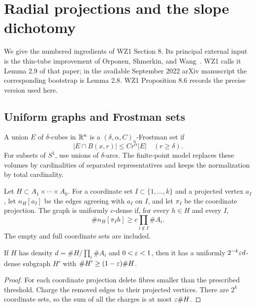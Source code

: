 \chapter{Radial projections and the slope dichotomy}
\label{chap:radial}

We give the numbered ingredients of WZ1 Section 8. Its principal
external input is the thin-tube improvement of Orponen, Shmerkin,
and Wang~\cite{OSW}. WZ1 calls it Lemma 2.9 of that paper; in the
available September 2022 arXiv manuscript the corresponding bootstrap
is Lemma 2.8. WZ1 Proposition 8.6 records the precise version used
here.

\section{Uniform graphs and Frostman sets}

\begin{definition}
\label{def:wz1-frostman}
A union $E$ of $\delta$-cubes in $\mathbb{R}^n$ is a
$(\delta,\alpha,C)_n$-Frostman set if
\[
                 |E\cap B(x,r)|\leq Cr^\alpha|E|
                 \quad(r\geq\delta).
\]
For subsets of $S^1$, use unions of $\delta$-arcs. The finite-point
model replaces these volumes by cardinalities of separated
representatives and keeps the normalization by total cardinality.
\end{definition}

\begin{definition}
\label{def:uniform-hypergraph}
\leanok
Let $H\subset A_1\times\cdots\times A_k$. For a coordinate set
$I\subset\{1,\ldots,k\}$ and a projected vertex $a_I$, let
$n_H[a_I]$ be the edges agreeing with $a_I$ on $I$, and let
$\pi_I$ be the coordinate projection. The graph is uniformly
$c$-dense if, for every $h\in H$ and every $I$,
\[
                    \#n_H[\pi_Ih]\geq c\prod_{i\notin I}\#A_i.
\]
The empty and full coordinate sets are included.
\end{definition}

\begin{lemma}
\label{lem:hypergraph-refinement}
\leanok
{}
If $H$ has density $d=\#H/\prod_i\#A_i$ and $0<\varepsilon<1$,
then it has a uniformly $2^{-k}\varepsilon d$-dense subgraph $H'$ with
$\#H'\geq(1-\varepsilon)\#H$.
\end{lemma}
\begin{proof}
\leanok
For each coordinate projection delete fibres smaller than the
prescribed threshold. Charge the removed edges to their projected
vertices. There are $2^k$ coordinate sets, so the sum of all the
charges is at most $\varepsilon\#H$.
\end{proof}

